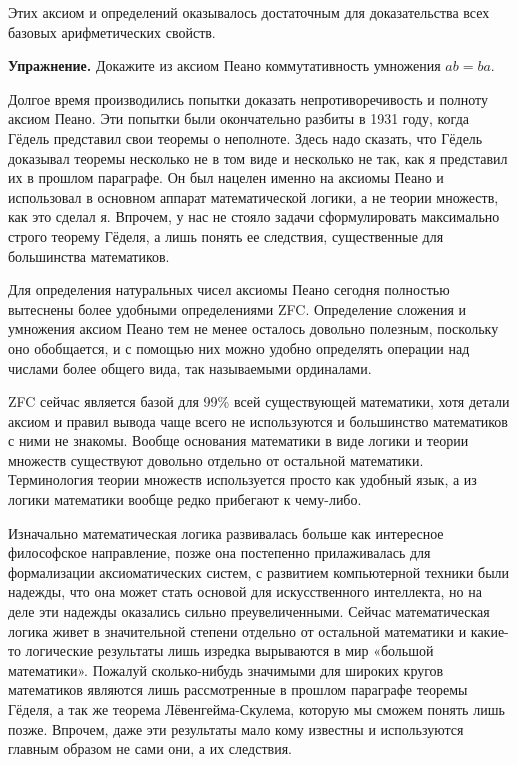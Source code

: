 Этих аксиом и определений оказывалось достаточным для доказательства всех базовых арифметических свойств.

{\bfseries Упражнение.} Докажите из аксиом Пеано коммутативность умножения $ab=ba$.

Долгое время производились попытки доказать непротиворечивость и полноту аксиом Пеано. Эти попытки были окончательно разбиты в 1931 году, когда Гёдель представил свои теоремы о неполноте. Здесь надо сказать, что Гёдель доказывал теоремы несколько не в том виде и несколько не так, как я представил их в прошлом параграфе. Он был нацелен именно на аксиомы Пеано и использовал в основном аппарат математической логики, а не теории множеств, как это сделал я. Впрочем, у нас не стояло задачи сформулировать максимально строго теорему Гёделя, а лишь понять ее следствия, существенные для большинства математиков.

Для определения натуральных чисел аксиомы Пеано сегодня полностью вытеснены более удобными определениями ZFC. Определение сложения и умножения аксиом Пеано тем не менее осталось довольно полезным, поскольку оно обобщается, и с помощью них  можно удобно определять операции над числами более общего вида, так называемыми ординалами.

ZFC сейчас является базой для 99\% всей существующей математики, хотя детали аксиом и правил вывода чаще всего не используются и большинство математиков с ними не знакомы. Вообще основания математики в виде логики и теории множеств существуют довольно отдельно от остальной математики. Терминология теории множеств используется просто как удобный язык, а из логики математики вообще редко прибегают к чему-либо.

Изначально математическая логика развивалась больше как интересное философское направление, позже она постепенно прилаживалась для формализации аксиоматических систем, с развитием компьютерной техники были надежды, что она может стать основой для искусственного интеллекта, но на деле эти надежды оказались сильно преувеличенными. Сейчас математическая логика живет в значительной степени отдельно от остальной математики и какие-то логические результаты лишь изредка вырываются в мир «большой математики». Пожалуй сколько-нибудь значимыми для широких кругов математиков являются лишь рассмотренные в прошлом параграфе теоремы Гёделя, а так же теорема Лёвенгейма-Скулема, которую мы сможем понять лишь позже. Впрочем, даже эти результаты мало кому известны и используются главным образом не сами они, а их следствия.

